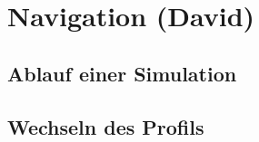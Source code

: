 \chapter{Navigation (David)}
\label{chap:nav}

	\section{Ablauf einer Simulation}
	\label{sec:sim-ablauf}
	
	\section{Wechseln des Profils}
	\label{sec:change-prof}